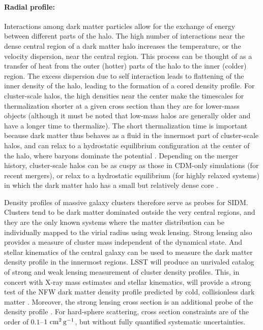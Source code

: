 \paragraph{Radial profile:} Interactions among dark matter particles allow for the exchange of energy between different parts of the halo. The high number of interactions near the dense central region of a dark matter halo increases the temperature, or the velocity dispersion, near the central region. This process can be thought of as a transfer of heat from the outer (hotter) parts of the halo to the inner (colder) region. The excess dispersion due to self interaction leads to flattening of the inner density of the halo, leading to the formation of a cored density profile. For cluster-scale halos, the high densities near the center make the timescales for thermalization shorter at a given cross section than they are for lower-mass objects (although it must be noted that low-mass halos are generally older and have a longer time to thermalize).  The short thermalization time is important because dark matter thus behaves as a fluid in the innermost part of cluster-scale halos, and can relax to a hydrostatic equilibrium configuration at the center of the halo, where baryons dominate the potential \citep{Kaplinghat:2015aga}.  Depending on the merger history, cluster-scale halos can be as cuspy as those in CDM-only simulations (for recent mergers), or relax to a hydrostatic equilibrium (for highly relaxed systems) in which the dark matter halo has a small but relatively dense core \citep{Robertson:2017mgj}.

Density profiles of massive galaxy clusters therefore serve as probes for SIDM. Clusters tend to be dark matter dominated outside the very central regions, and they are the only known systems where the matter distribution can be individually mapped to the virial radius using weak lensing. Strong lensing also provides a measure of cluster mass independent of the dynamical state. And stellar kinematics of the central galaxy can be used to measure the dark matter density profile in the innermost regions. LSST will produce an unrivaled catalog of strong and weak lensing measurement of cluster density profiles. This, in concert with X-ray mass estimates and stellar kinematics, will provide a strong test of the NFW dark matter density profile predicted by cold, collisionless dark matter \citep{Newman:2013,Kaplinghat:2015aga,Robertson:2018anx,Andrade:2019wzn}. Moreover, the strong lensing cross section is an additional probe of the density profile \citep{Robertson:2018anx}.  For hard-sphere scattering, cross section constraints are of the order of $0.1$--$1\mathrm{\,\mathrm{\,cm}^2\mathrm{\,g}^{-1}}$, but without fully quantified systematic uncertainties.


